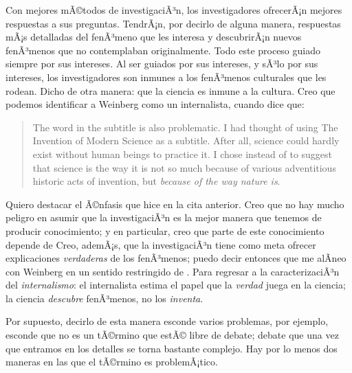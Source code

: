 Con mejores mÃ©todos de investigaciÃ³n, los investigadores ofrecerÃ¡n mejores respuestas a sus preguntas.
TendrÃ¡n, por decirlo de alguna manera, respuestas mÃ¡s detalladas del fenÃ³meno que les interesa y descubrirÃ¡n nuevos fenÃ³menos que no contemplaban originalmente.
Todo este proceso guiado siempre por sus intereses.
Al ser guiados por sus intereses, y sÃ³lo por sus intereses, los investigadores son inmunes a los fenÃ³menos culturales que les rodean.
Dicho de otra manera: que la ciencia es inmune a la cultura. Creo que
podemos identificar a Weinberg como
un internalista, cuando dice que:

	\begin{quote}
	
	The word  in the subtitle is also problematic.
	I had thought of using The Invention of Modern Science as
	a subtitle. After all, science could hardly exist without human
	beings to practice it. I chose  instead of
	 to suggest that science is the way it is not so
	much because of various adventitious historic acts of invention,
	but \emph{because of the way nature is}. \parencite[Prefacio,
	Ã©nfasis agregado]{Weinberg2015}

	\end{quote}

Quiero destacar el Ã©nfasis que hice en la cita anterior. Creo que no hay
mucho peligro en asumir que la investigaciÃ³n es la mejor manera que
tenemos de producir conocimiento; y en particular, creo que parte de este
conocimiento depende de  Creo,
ademÃ¡s, que la investigaciÃ³n tiene como meta ofrecer explicaciones
\emph{verdaderas} de los fenÃ³menos; puedo decir entonces que me alÃ­neo con
Weinberg en un sentido restringido de . Para regresar a la caracterizaciÃ³n del
\emph{internalismo}: el internalista estima el papel que la \emph{verdad}
juega en la ciencia; la ciencia \emph{descubre} fenÃ³menos, no los
\emph{inventa}.

Por supuesto, decirlo de esta manera esconde varios problemas, por ejemplo, esconde que  no es un tÃ©rmino que estÃ© libre de debate; debate que una vez que entramos en los detalles se torna bastante complejo.
Hay por lo menos dos maneras en las que el tÃ©rmino es problemÃ¡tico.

